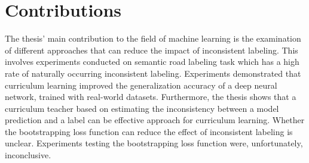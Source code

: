\section{Contributions}
\label{sec:IntroContributions}
The thesis' main contribution to the field of machine learning is the examination of different approaches that can reduce the impact of inconsistent labeling. This involves experiments conducted on semantic road labeling task which has a high rate of naturally occurring inconsistent labeling. Experiments demonstrated that curriculum learning improved the generalization accuracy of a deep neural network, trained with real-world datasets. Furthermore, the thesis shows that a curriculum teacher based on estimating the inconsistency between a model prediction and a label can be effective approach for curriculum learning. Whether the bootstrapping loss function can reduce the effect of inconsistent labeling is unclear. Experiments testing the bootstrapping loss function were, unfortunately, inconclusive.